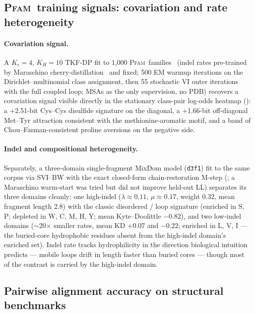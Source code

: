 \documentclass[11pt]{article}
\theoremstyle{definition}
\theoremstyle{remark}
\newcommand{\Pfam}{\textsc{Pfam}}
\begin{document}
\subsection{\Pfam\ training signals: covariation and rate heterogeneity}
\label{sec:results-tkfdp}

\paragraph{Covariation signal.}
A $K_c{=}4$, $K_H{=}10$ TKF-DP fit to 1{,}000 \Pfam\
families~\citep{Pfam2021} (indel rates pre-trained by Maraschino
cherry-distillation~\citep{Prillo2022CherryML} and fixed; 500 EM
warmup iterations on the Dirichlet--multinomial class assignment,
then 55 stochastic VI outer iterations with the full coupled loop;
MSAs as the only supervision, no PDB) recovers a covariation signal
visible directly in the stationary class-pair log-odds heatmap
(): a +2.51-bit Cys--Cys disulfide
signature on the diagonal, a +1.66-bit off-diagonal Met--Tyr
attraction consistent with the methionine-aromatic motif, and a
band of Chou--Fasman-consistent proline aversions on the negative
side.

\paragraph{Indel and compositional heterogeneity.}
Separately, a three-domain single-fragment MixDom model
(\texttt{d3f1}) fit to the same corpus via SVI--BW with the exact
closed-form chain-restoration M-step (\Cref{sec:rung1}; a
Maraschino warm-start was tried but did not improve held-out LL)
separates its three domains cleanly: one
high-indel ($\lambda{\approx}0.11$, $\mu{\approx}0.17$, weight
0.32, mean fragment length 2.8) with the classic disordered / loop
signature (enriched in S, P; depleted in W, C, M, H, Y; mean
Kyte--Doolittle $-0.82$), and two low-indel domains
($\sim$20$\times$ smaller rates, mean KD $+0.07$ and $-0.22$;
enriched in L, V, I --- the buried-core hydrophobic residues
absent from the high-indel domain's enriched set). Indel
rate tracks hydrophilicity in the direction biological intuition
predicts --- mobile loops drift in length faster than buried cores
--- though most of the contrast is carried by the high-indel domain.

\subsection{Pairwise alignment accuracy on structural benchmarks}
\label{sec:results-aln}
\end{document}
